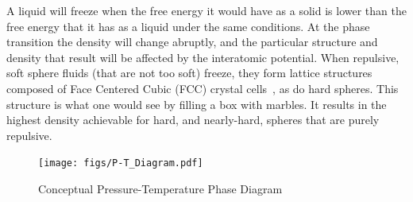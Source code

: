 \documentclass[double,12pt]{beavtex}
\begin{document}
 
A liquid will freeze when the free energy it would have as a solid is lower 
than the free energy that it has as a liquid under the same conditions.
At the phase transition the density will change abruptly, and
the particular structure and density that result will be affected 
by the interatomic potential. When repulsive, soft sphere fluids 
(that are not too soft) freeze, they form lattice structures composed of 
Face Centered Cubic (FCC) crystal cells~\cite{Hansen}, as do hard spheres. 
This structure is what one would see by filling a box with marbles. It 
results in the highest density achievable for hard, and nearly-hard, spheres 
that are purely repulsive. 

\begin{figure}
    \centering
    \texttt{[image: figs/P-T\_Diagram.pdf]}
    \caption{Conceptual Pressure-Temperature Phase Diagram}
    \label{fig:P-T_Diagram}
\end{figure}
\end{document}
